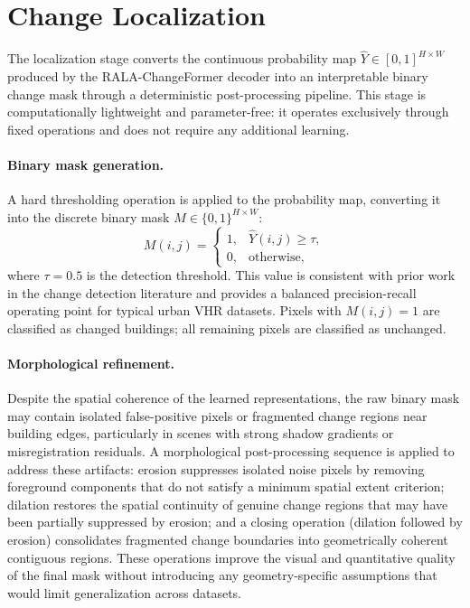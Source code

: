 \section{Change Localization}
\label{sec:localization}

The localization stage converts the continuous probability map $\hat{Y} \in [0,1]^{H \times W}$ produced by the RALA-ChangeFormer decoder into an interpretable binary change mask through a deterministic post-processing pipeline. This stage is computationally lightweight and parameter-free: it operates exclusively through fixed operations and does not require any additional learning.

\paragraph{Binary mask generation.} A hard thresholding operation is applied to the probability map, converting it into the discrete binary mask $M \in \{0,1\}^{H \times W}$:
\begin{equation}
M(i,j) =
\begin{cases}
1, & \hat{Y}(i,j) \geq \tau, \\
0, & \text{otherwise,}
\end{cases}
\label{eq:masking}
\end{equation}
where $\tau = 0.5$ is the detection threshold. This value is consistent with prior work in the change detection literature \cite{Bandara2022ChangeFormer, Zheng2022HFANet} and provides a balanced precision-recall operating point for typical urban \ac{VHR} datasets. Pixels with $M(i,j) = 1$ are classified as changed buildings; all remaining pixels are classified as unchanged.

\paragraph{Morphological refinement.} Despite the spatial coherence of the learned representations, the raw binary mask may contain isolated false-positive pixels or fragmented change regions near building edges, particularly in scenes with strong shadow gradients or misregistration residuals. A morphological post-processing sequence is applied to address these artifacts: erosion suppresses isolated noise pixels by removing foreground components that do not satisfy a minimum spatial extent criterion; dilation restores the spatial continuity of genuine change regions that may have been partially suppressed by erosion; and a closing operation (dilation followed by erosion) consolidates fragmented change boundaries into geometrically coherent contiguous regions. These operations improve the visual and quantitative quality of the final mask without introducing any geometry-specific assumptions that would limit generalization across datasets.

